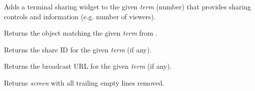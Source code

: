 \documentclass[letterpaper,10pt,openany]{sphinxmanual}
\begin{document}

\begin{fulllineitems}
\label{Applications/terminal/js_terminal:GateOne.Terminal.shareWidget}
Adds a terminal sharing widget to the given \emph{term} (number) that provides sharing controls and information (e.g. number of viewers).

\end{fulllineitems}


\begin{fulllineitems}
\label{Applications/terminal/js_terminal:GateOne.Terminal.sharedTermObj}
Returns the object matching the given \emph{term} from .

\end{fulllineitems}


\begin{fulllineitems}
\label{Applications/terminal/js_terminal:GateOne.Terminal.shareID}
Returns the share ID for the given \emph{term} (if any).

\end{fulllineitems}


\begin{fulllineitems}
\label{Applications/terminal/js_terminal:GateOne.Terminal.shareBroadcastURL}
Returns the broadcast URL for the given \emph{term} (if any).

\end{fulllineitems}


\begin{fulllineitems}
\label{Applications/terminal/js_terminal:GateOne.Terminal._trimmedScreen}
Returns \emph{screen} with all trailing empty lines removed.

\end{fulllineitems}
\end{document}
